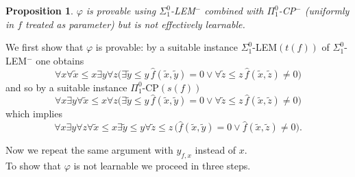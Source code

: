 \documentclass[1p]{elsarticle}
\theoremstyle{plain}
\newtheorem{prop}[thm]{Proposition}
\theoremstyle{definition}
\theoremstyle{remark}
\renewenvironment{proof}[1][]{\noindent{\bf Proof{#1}. }}{\nopagebreak[4]{\hspace*{\fill}
  $\Box$              %
 }{\vspace{2ex}}}
\theoremstyle{definition}
\begin{document}
{\begin{prop}\label{p:nonLearnablePhi} $\varphi$  
is provable using {\rm $\Sigma^0_1$-LEM$^-$} combined with 
{\rm $\Pi^0_1$-CP$^-$} (uniformly in $f$ treated as parameter) but  
is not effectively learnable.
\end{prop}
\begin{proof}
We first show that $\varphi$ is provable: by a suitable instance 
$\Sigma^0_1$-LEM$(t(f))$ of $\Sigma^0_1$-LEM$^-$ one obtains 
\[ \forall x\forall \tilde{x}\le x\exists y\forall z \big( 
\exists \tilde{y}\le y\,\widehat{f}(\tilde{x},\tilde{y})=0 \vee \forall 
\tilde{z}\le z 
\,\widehat{f}(\tilde{x},\tilde{z})\not=0\big) \] 
and so by a suitable instance $\Pi^0_1$-CP$(s(f))$ 
\[ \forall x\exists y \forall \tilde{x}\le x \forall z 
\big( 
\exists \tilde{y}\le y\,\widehat{f}(\tilde{x},\tilde{y})=0 \vee \forall 
\tilde{z}\le z 
\,\widehat{f}(\tilde{x},\tilde{z})\not=0\big) \] which implies  
\[ \forall x\exists y \forall z\forall \tilde{x}\le x \exists \tilde{y}\le y
\forall \tilde{z}\le z\, 
\big( \widehat{f}(\tilde{x},\tilde{y})=0 \vee 
\widehat{f}(\tilde{x},\tilde{z})\not=0\big). \]

Now we repeat the same argument with $y_{f,x}$ instead of $x.$
\\[1mm] 
To show that $\varphi$ is not learnable we proceed in three steps.

\end{proof}}
\end{document}
